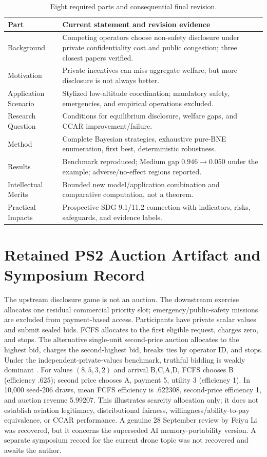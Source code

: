 \begin{table}[H]\caption{Eight required parts and consequential final revision.}\renewcommand{\arraystretch}{1.12}
\begin{tabularx}{\textwidth}{@{}p{}Y@{}}\toprule Part & Current statement and revision evidence\\\midrule
Background & Competing operators choose non-safety disclosure under private confidentiality cost and public congestion; three closest papers verified.\\
Motivation & Private incentives can miss aggregate welfare, but more disclosure is not always better.\\
Application Scenario & Stylized low-altitude coordination; mandatory safety, emergencies, and empirical operations excluded.\\
Research Question & Conditions for equilibrium disclosure, welfare gaps, and CCAR improvement/failure.\\
Method & Complete Bayesian strategies, exhaustive pure-BNE enumeration, first best, deterministic robustness.\\
Results & Benchmark reproduced; Medium gap $0.946\rightarrow0.050$ under the example; adverse/no-effect regions reported.\\
Intellectual Merits & Bounded new model/application combination and comparative computation, not a theorem.\\
Practical Impacts & Prospective SDG 9.1/11.2 connection with indicators, risks, safeguards, and evidence labels.\\\bottomrule
\end{tabularx}\end{table}

\section{Retained PS2 Auction Artifact and Symposium Record}
The upstream disclosure game is not an auction. The downstream exercise allocates one residual commercial priority slot; emergency/public-safety missions are excluded from payment-based access. Participants have private scalar values and submit sealed bids. FCFS allocates to the first eligible request, charges zero, and stops. The alternative single-unit second-price auction allocates to the highest bid, charges the second-highest bid, breaks ties by operator ID, and stops. Under the independent-private-values benchmark, truthful bidding is weakly dominant \cite{vickrey1961counterspeculation}. For values $(8,5,3,2)$ and arrival B,C,A,D, FCFS chooses B (efficiency .625); second price chooses A, payment 5, utility 3 (efficiency 1). In 10,000 seed-206 draws, mean FCFS efficiency is .622308, second-price efficiency 1, and auction revenue 5.99207. This illustrates scarcity allocation only; it does not establish aviation legitimacy, distributional fairness, willingness/ability-to-pay equivalence, or CCAR performance. A genuine 28 September review by Feiyu Li was recovered, but it concerns the superseded AI memory-portability version. A separate symposium record for the current drone topic was not recovered and awaits the author.

